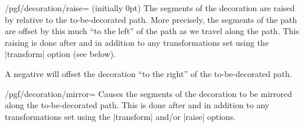 \begin{key}{/pgf/decoration/raise= (initially 0pt)}
    The segments of the decoration are raised by  relative to
    the to-be-decorated path. More precisely, the segments of the path are
    offset by this much ``to the left'' of the path as we travel along the
    path. This raising is done after and in addition to any transformations set
    using the |transform| option (see below).

    A negative  will offset the decoration ``to the right'' of
    the to-be-decorated path.
\begin{codeexample}[preamble={\usetikzlibrary{decorations.shapes}}]
\end{codeexample}
\end{key}

\begin{key}{/pgf/decoration/mirror=}
    Causes the segments of the decoration to be mirrored along the
    to-be-decorated path. This is done after and in addition to any
    transformations set using the |transform| and/or |raise| options.
\begin{codeexample}[preamble={\usetikzlibrary{decorations.pathreplacing}}]
\end{codeexample}
\end{key}

